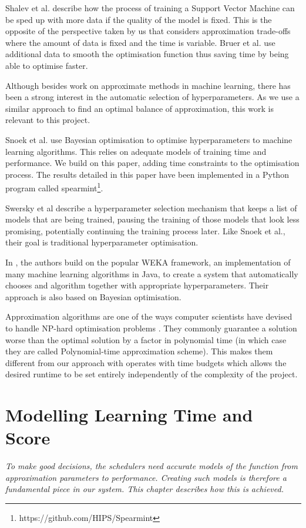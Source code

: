 \documentclass[a4paper,12pt,twoside,openright]{report}
\begin{document}
Shalev et al. \cite{Shalev-Shwartz:2008:SOI:1390156.1390273} describe how the process of training a Support Vector Machine can be sped up with more data if the quality of the model is fixed. This is the opposite of the perspective taken by us that considers approximation trade-offs where the amount of data is fixed and the time is variable. Bruer et al. \cite{NIPS2014_5259} use additional data to smooth the optimisation function thus saving time by being able to optimise faster.

Although besides work on approximate methods in machine learning, there has been a strong interest in the automatic selection of hyperparameters. As we use a similar approach to find an optimal balance of approximation, this work is relevant to this project.

Snoek et al. \cite{PracticalBayesianOptimization} use Bayesian optimisation to optimise hyperparameters to machine learning algorithms. This relies on adequate models of training time and performance. We build on this paper, adding time constraints to the optimisation process. The results detailed in this paper have been implemented in a Python program called spearmint\footnote{https://github.com/HIPS/Spearmint}.

Swersky et al \cite{2014arXiv1406.3896S} describe a hyperparameter selection mechanism that keeps a list of models that are being trained, pausing the training of those models that look less promising, potentially continuing the training process later. Like Snoek et al., their goal is traditional hyperparameter optimisation.

In \cite{ThoHutHooLey13-AutoWEKA}, the authors build on the popular WEKA framework, an implementation of many machine learning algorithms in Java, to create a system that automatically chooses and algorithm together with appropriate hyperparameters. Their approach is also based on Bayesian optimisation.

Approximation algorithms are one of the ways computer scientists have devised to handle NP-hard optimisation problems \cite{Vazirani:2001:AA:500776}. They commonly guarantee a solution worse than the optimal solution by a factor in polynomial time (in which case they are called Polynomial-time approximation scheme). This makes them different from our approach with operates with time budgets which allows the desired runtime to be set entirely independently of the complexity of the project.




\chapter{Modelling Learning Time and Score}
\textit{To make good decisions, the schedulers need accurate models of the function from approximation parameters to performance. Creating such models is therefore a fundamental piece in our system. This chapter describes how this is achieved.}
\end{document}
